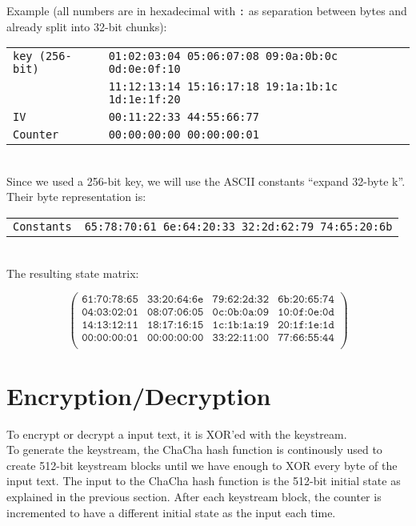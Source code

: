 Example (all numbers are in hexadecimal with \texttt{:} as separation between bytes and already split into 32-bit chunks):\\

\begin{tabular}{ l l }
 \texttt{key (256-bit)} & \texttt{01:02:03:04 05:06:07:08 09:0a:0b:0c 0d:0e:0f:10} \\ 
 & \texttt{11:12:13:14 15:16:17:18 19:1a:1b:1c 1d:1e:1f:20}\\
 \texttt{IV} & \texttt{00:11:22:33 44:55:66:77} \\  
\texttt{Counter} & \texttt{00:00:00:00 00:00:00:01} \\
\end{tabular}
\\

\noindent Since we used a 256-bit key, we will use the ASCII constants ``expand 32-byte k''. Their byte representation is:\\

\begin{tabular}{ l l }
\texttt{Constants} & \texttt{65:78:70:61 6e:64:20:33 32:2d:62:79 74:65:20:6b} \\
\end{tabular}
\\

\noindent The resulting state matrix:

\begin{equation*}
\begin{pmatrix}
\texttt{61:70:78:65}& \texttt{33:20:64:6e} & \texttt{79:62:2d:32} & \texttt{6b:20:65:74} \\
\texttt{04:03:02:01} & \texttt{08:07:06:05} & \texttt{0c:0b:0a:09} & \texttt{10:0f:0e:0d} \\
\texttt{14:13:12:11} & \texttt{18:17:16:15} & \texttt{1c:1b:1a:19} & \texttt{20:1f:1e:1d} \\
\texttt{00:00:00:01} & \texttt{00:00:00:00} & \texttt{33:22:11:00} & \texttt{77:66:55:44} \\
\end{pmatrix}
\end{equation*}

\section{Encryption/Decryption}
\label{sec:chacha.encryption}

To encrypt or decrypt a input text, it is XOR'ed with the keystream. \\
To generate the keystream, the ChaCha hash function is continously used to create 512-bit keystream blocks until we have enough to XOR every byte of the input text. The input to the ChaCha hash function is the 512-bit initial state as explained in the previous section. After each keystream block, the counter is incremented to have a different initial state as the input each time.

